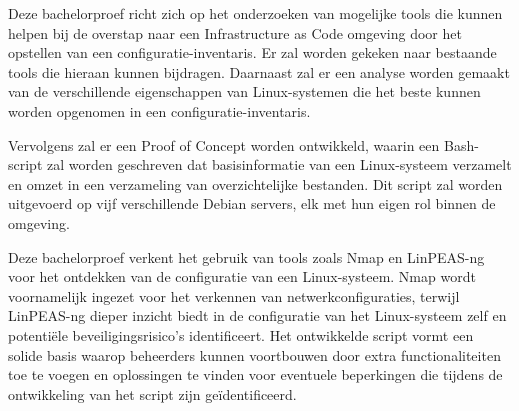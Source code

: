Deze bachelorproef richt zich op het onderzoeken van mogelijke tools die kunnen helpen bij de overstap naar een Infrastructure as Code omgeving door het opstellen van een configuratie-inventaris.
Er zal worden gekeken naar bestaande tools die hieraan kunnen bijdragen.
Daarnaast zal er een analyse worden gemaakt van de verschillende eigenschappen van Linux-systemen die het beste kunnen worden opgenomen in een configuratie-inventaris.

Vervolgens zal er een Proof of Concept worden ontwikkeld, waarin een Bash-script zal worden geschreven dat basisinformatie van een Linux-systeem verzamelt en omzet in een verzameling van overzichtelijke bestanden.
Dit script zal worden uitgevoerd op vijf verschillende Debian servers, elk met hun eigen rol binnen de omgeving.

Deze bachelorproef verkent het gebruik van tools zoals Nmap en LinPEAS-ng voor het ontdekken van de configuratie van een Linux-systeem.
Nmap wordt voornamelijk ingezet voor het verkennen van netwerkconfiguraties, terwijl LinPEAS-ng dieper inzicht biedt in de configuratie van het Linux-systeem zelf en potentiële beveiligingsrisico's identificeert.
Het ontwikkelde script vormt een solide basis waarop beheerders kunnen voortbouwen door extra functionaliteiten toe te voegen en oplossingen te vinden voor eventuele beperkingen die tijdens de ontwikkeling van het script zijn geïdentificeerd.
